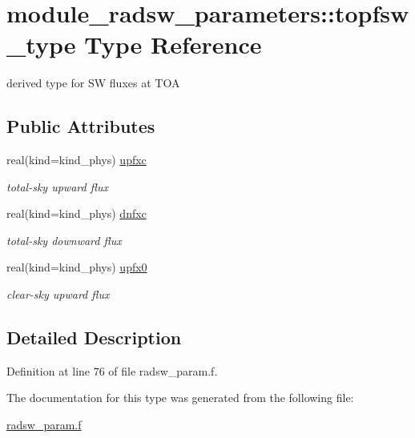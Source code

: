 \hypertarget{structmodule__radsw__parameters_1_1topfsw__type}{}\section{module\+\_\+radsw\+\_\+parameters\+:\+:topfsw\+\_\+type Type Reference}
\label{structmodule__radsw__parameters_1_1topfsw__type}


derived type for SW fluxes at T\+OA  


\subsection*{Public Attributes}
\textbf{ }\par
\begin{DoxyCompactItemize}
\item 
\mbox{\label{structmodule__radsw__parameters_1_1topfsw__type_a444a7fd67ff2c22403779a5e83eef09b}} 
real(kind=kind\+\_\+phys) \hyperlink{structmodule__radsw__parameters_1_1topfsw__type_a444a7fd67ff2c22403779a5e83eef09b}{upfxc}
\begin{DoxyCompactList}\small\item\em total-\/sky upward flux \end{DoxyCompactList}\item 
\mbox{\label{structmodule__radsw__parameters_1_1topfsw__type_ac1466bb6a9da92a59bdef51439320f35}} 
real(kind=kind\+\_\+phys) \hyperlink{structmodule__radsw__parameters_1_1topfsw__type_ac1466bb6a9da92a59bdef51439320f35}{dnfxc}
\begin{DoxyCompactList}\small\item\em total-\/sky downward flux \end{DoxyCompactList}\item 
\mbox{\label{structmodule__radsw__parameters_1_1topfsw__type_a992c82c935dcb4d6269c905fc184cf48}} 
real(kind=kind\+\_\+phys) \hyperlink{structmodule__radsw__parameters_1_1topfsw__type_a992c82c935dcb4d6269c905fc184cf48}{upfx0}
\begin{DoxyCompactList}\small\item\em clear-\/sky upward flux \end{DoxyCompactList}\end{DoxyCompactItemize}



\subsection{Detailed Description}


Definition at line 76 of file radsw\+\_\+param.\+f.



The documentation for this type was generated from the following file\+:\begin{DoxyCompactItemize}
\item 
\hyperlink{radsw__param_8f}{radsw\+\_\+param.\+f}\end{DoxyCompactItemize}
